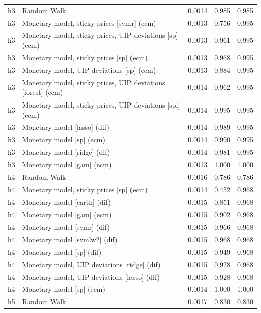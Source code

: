 \begin{ThreePartTable}
\begin{longtable}[t]{cp{5.5cm}ccc}
\addlinespace
h3 & \raggedright Random Walk & 0.0014 & 0.985 & 0.985\\
h3 & \raggedright Monetary model, sticky prices [svmr] (ecm) & 0.0013 & 0.756 & 0.995\\
h3 & \raggedright Monetary model, sticky prices, UIP deviations [sp] (ecm) & 0.0013 & 0.961 & 0.995\\
h3 & \raggedright Monetary model, sticky prices [sp] (ecm) & 0.0013 & 0.968 & 0.995\\
h3 & \raggedright Monetary model, UIP deviations [sp] (ecm) & 0.0013 & 0.884 & 0.995\\
h3 & \raggedright Monetary model, sticky prices, UIP deviations [forest] (ecm) & 0.0014 & 0.962 & 0.995\\
h3 & \raggedright Monetary model, sticky prices, UIP deviations [spi] (ecm) & 0.0014 & 0.995 & 0.995\\
h3 & \raggedright Monetary model [lasso] (dif) & 0.0014 & 0.989 & 0.995\\
h3 & \raggedright Monetary model [sp] (ecm) & 0.0014 & 0.990 & 0.995\\
h3 & \raggedright Monetary model [ridge] (dif) & 0.0014 & 0.981 & 0.995\\
h3 & \raggedright Monetary model [gam] (ecm) & 0.0013 & 1.000 & 1.000\\
\addlinespace
h4 & \raggedright Random Walk & 0.0016 & 0.786 & 0.786\\
h4 & \raggedright Monetary model, sticky prices [sp] (ecm) & 0.0014 & 0.452 & 0.968\\
h4 & \raggedright Monetary model [earth] (dif) & 0.0015 & 0.851 & 0.968\\
h4 & \raggedright Monetary model [gam] (ecm) & 0.0015 & 0.902 & 0.968\\
h4 & \raggedright Monetary model [svmr] (dif) & 0.0015 & 0.966 & 0.968\\
h4 & \raggedright Monetary model [svmlw2] (dif) & 0.0015 & 0.968 & 0.968\\
h4 & \raggedright Monetary model [sp] (dif) & 0.0015 & 0.949 & 0.968\\
h4 & \raggedright Monetary model, UIP deviations [ridge] (dif) & 0.0015 & 0.928 & 0.968\\
h4 & \raggedright Monetary model, UIP deviations [lasso] (dif) & 0.0015 & 0.928 & 0.968\\
h4 & \raggedright Monetary model [sp] (ecm) & 0.0014 & 1.000 & 1.000\\
\addlinespace
h5 & \raggedright Random Walk & 0.0017 & 0.830 & 0.830\\

\end{longtable}
\end{ThreePartTable}
